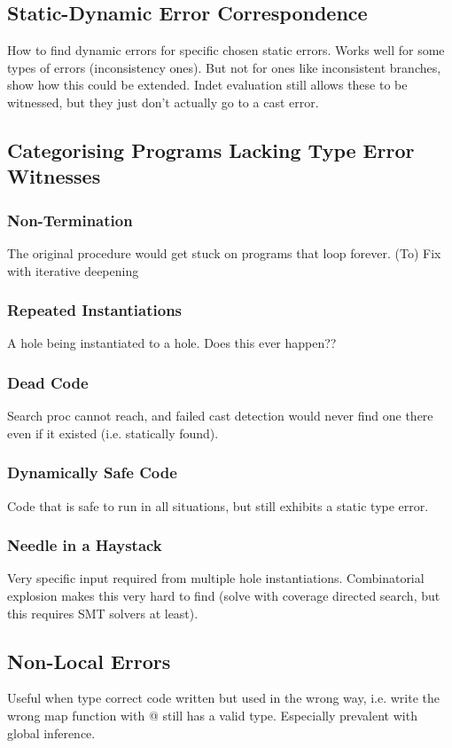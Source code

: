 \subsection{Static-Dynamic Error Correspondence}
How to find dynamic errors for specific chosen static errors. Works well for some types of errors (inconsistency ones). But not for ones like inconsistent branches, show how this could be extended. Indet evaluation still allows these to be witnessed, but they just don't actually go to a cast error.
  
\subsection{Categorising Programs Lacking Type Error Witnesses}
\subsubsection{Non-Termination}
The original procedure would get stuck on programs that loop forever. (To) Fix with iterative deepening
\subsubsection{Repeated Instantiations}
A hole being instantiated to a hole. Does this ever happen??
\subsubsection{Dead Code}
Search proc cannot reach, and failed cast detection would never find one there even if it existed (i.e. statically found).
\subsubsection{Dynamically Safe Code}
Code that is safe to run in all situations, but still exhibits a static type error.

\subsubsection{Needle in a Haystack}
Very specific input required from multiple hole instantiations. Combinatorial explosion makes this very hard to find (solve with coverage directed search, but this requires SMT solvers at least).

\subsection{Non-Local Errors}
Useful when type correct code written but used in the wrong way, i.e. write the wrong map function with @ still has a valid type. Especially prevalent with global inference.
